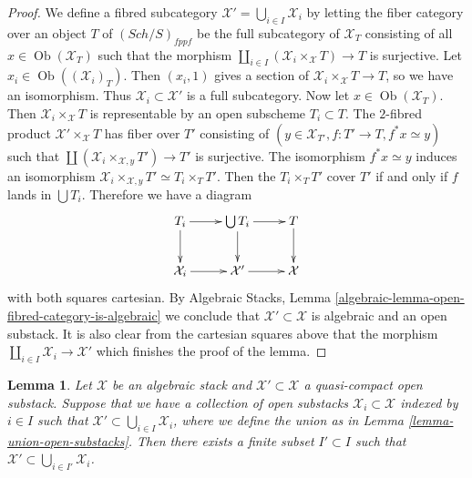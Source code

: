 \documentclass{stacks-project}
\theoremstyle{plain}
\newtheorem{lemma}[subsection]{Lemma}
\theoremstyle{definition}
\theoremstyle{remark}
\numberwithin{equation}{subsection}
\def\Sch{\mathit{Sch}}
\def\Ob{\mathop{\mathrm{Ob}}\nolimits}
\begin{document}
\begin{proof}
We define a fibred subcategory
$\mathcal{X}' = \bigcup_{i \in I} \mathcal{X}_i$
by letting the fiber category over an object $T$ of $(\Sch/S)_{fppf}$
be the full subcategory of $\mathcal{X}_T$ consisting of all
$x \in \Ob(\mathcal{X}_T)$ such that the morphism
$\coprod_{i \in I} (\mathcal{X}_i \times_{\mathcal X} T) \to T$
is surjective. Let $x_i \in \Ob((\mathcal{X}_i)_T)$.
Then $(x_i, 1)$ gives a section of
$\mathcal{X}_i \times_{\mathcal X} T \to T$, so we have an isomorphism. Thus
$\mathcal{X}_i \subset \mathcal{X}'$ is a full subcategory.
Now let $x \in \Ob(\mathcal{X}_T)$. Then
$\mathcal{X}_i \times_{\mathcal X} T$ is representable
by an open subscheme $T_i \subset T$. The $2$-fibred product
$\mathcal{X}' \times_{\mathcal X} T$ has fiber over $T'$ consisting
of $(y \in \mathcal{X}_{T'}, f : T' \to T, f^*x \simeq y)$ such that
$\coprod (\mathcal{X}_i \times_{\mathcal X, y} T') \to T'$ is surjective.
The isomorphism $f^*x \simeq y$ induces an isomorphism
$\mathcal{X}_i \times_{\mathcal X, y} T' \simeq T_i \times_T T'$.
Then the $T_i \times_T T'$ cover $T'$ if and only if $f$ lands in
$\bigcup T_i$. Therefore we have a diagram
$$
\xymatrix{
T_i \ar[r] \ar[d] &
\bigcup T_i \ar[r] \ar[d] &
T \ar[d] \\
\mathcal{X}_i \ar[r] &
\mathcal{X}' \ar[r] &
\mathcal{X}
}
$$
with both squares cartesian. By
Algebraic Stacks, Lemma \ref{algebraic-lemma-open-fibred-category-is-algebraic}
we conclude that $\mathcal{X'} \subset \mathcal{X}$ is algebraic and an
open substack. It is also clear from the cartesian squares above that the
morphism $\coprod_{i \in I} \mathcal{X}_i \to \mathcal{X}'$ which
finishes the proof of the lemma.
\end{proof}

\begin{lemma}
\label{lemma-quasi-compact-finite-subcover}
Let $\mathcal X$ be an algebraic stack and $\mathcal X' \subset \mathcal X$
a quasi-compact open substack. Suppose that we have a collection of open
substacks $\mathcal{X}_i \subset \mathcal X$  indexed by $i \in I$ such
that $\mathcal{X}' \subset \bigcup_{i \in I} \mathcal{X}_i$,
where we define the union as in Lemma \ref{lemma-union-open-substacks}.
Then there exists a finite subset $I' \subset I$ such that
$\mathcal{X}' \subset \bigcup_{i \in I'} \mathcal{X}_i$.
\end{lemma}
\end{document}
